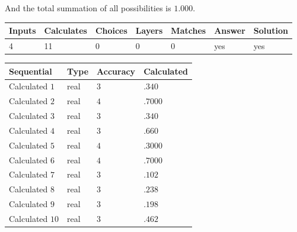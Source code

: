\documentclass[12pt]{article}
\begin{document}
\noindent
 And the total summation of all possibilities is $  %
1.000 $.
 
 
 
\noindent{}
 
 

 
\vspace{0.3in}
   
   
   
   
\noindent\begin{tabular}{|l|l|l|l|l|l|l|}
 \hline
Inputs & Calculates & Choices & Layers & Matches & Answer & Solution \\ \hline
           4 & 
          11 & 
           0
  & 
           0 & 
           0 & 
  yes & 
  yes 
  \\ \hline
 \end{tabular}
   
   
   
   
\noindent{}
   
   
  
  
\noindent\begin{tabular}{|l|l|l|l|}
\hline
 Sequential & Type & Accuracy & Calculated \\ 
\hline
 
 
  Calculated $           1$ & real & $           3 $ & 
 $ .340 $ 
 \\  \hline  
 
 
  Calculated $           2$ & real & $           4 $ & 
 $ .7000 $ 
 \\  \hline  
 
 
  Calculated $           3$ & real & $           3 $ & 
 $ .340 $ 
 \\  \hline  
 
 
  Calculated $           4$ & real & $           3 $ & 
 $ .660 $ 
 \\  \hline  
 
 
  Calculated $           5$ & real & $           4 $ & 
 $ .3000 $ 
 \\  \hline  
 
 
  Calculated $           6$ & real & $           4 $ & 
 $ .7000 $ 
 \\  \hline  
 
 
  Calculated $           7$ & real & $           3 $ & 
 $ .102 $ 
 \\  \hline  
 
 
  Calculated $           8$ & real & $           3 $ & 
 $ .238 $ 
 \\  \hline  
 
 
  Calculated $           9$ & real & $           3 $ & 
 $ .198 $ 
 \\  \hline  
 
 
  Calculated $          10$ & real & $           3 $ & 
 $ .462 $ 
 \\  \hline  
 \end{tabular}
   
\end{document}
